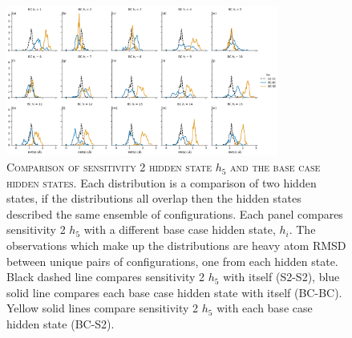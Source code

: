 \begin{figure}[h!]
 \centering
 \includegraphics[width=0.8\textwidth]{chapters/aadh/figures/sensitivity_2_5_overlap.png}
 \caption[Comparison of sensitivity 2 hidden state 5 with the base case hidden states]{\textsc{Comparison of sensitivity 2 hidden state $h_{5}$ and the base case hidden states}. Each distribution is a comparison of two hidden states, if the distributions all overlap then the hidden states described the same ensemble of configurations. Each panel compares sensitivity 2 $h_{5}$ with a different base case hidden state, $h_{i}$. The observations which make up the distributions are heavy atom RMSD between unique pairs of configurations, one from each hidden state. Black dashed line compares sensitivity 2 $h_{5}$ with itself (S2-S2), blue solid line compares each base case hidden state with itself (BC-BC). Yellow solid lines compare sensitivity 2 $h_{5}$ with each base case hidden state (BC-S2).}
 \label{fig:sens_2_overlap}
\end{figure}




